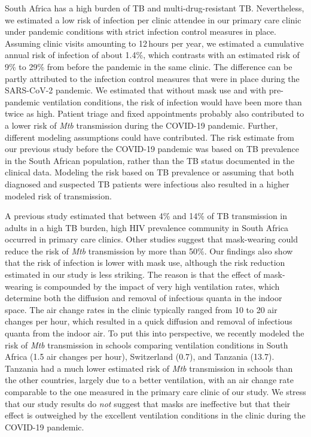 \documentclass[fleqn,11pt]{wlscirep}
\begin{document}
South Africa has a high burden of TB and multi-drug-resistant TB\cite{WHO2023TBReport}. Nevertheless, we estimated a low risk of infection per clinic attendee in our primary care clinic under pandemic conditions with strict infection control measures in place. Assuming clinic visits amounting to 12\,hours per year, we estimated a cumulative annual risk of infection of about 1.4\%, which contrasts with an estimated risk of 9\% to 29\% from before the pandemic in the same clinic\cite{Zurcher2022JID}. The difference can be partly attributed to the infection control measures that were in place during the SARS-CoV-2 pandemic. We estimated that without mask use and with pre-pandemic ventilation conditions, the risk of infection would have been more than twice as high. Patient triage and fixed appointments probably also contributed to a lower risk of \emph{Mtb} transmission during the COVID-19 pandemic. Further, different modeling assumptions could have contributed. The risk estimate from our previous study before the COVID-19 pandemic\cite{Zurcher2022JID} was based on TB prevalence in the South African population, rather than the TB status documented in the clinical data. Modeling the risk based on TB prevalence or assuming that both diagnosed and suspected TB patients were infectious also resulted in a higher modeled risk of transmission. 

A previous study estimated that between 4\% and 14\% of TB transmission in adults in a high TB burden, high HIV prevalence community in South Africa occurred in primary care clinics\cite{McCreesh2022BMJGlobalHealth}. Other studies suggest that mask-wearing could reduce the risk of \emph{Mtb} transmission by more than 50\%\cite{Dharmadhikari2012AJRCCM,McCreesh2021BMJGlobalHealth}. Our findings also show that the risk of infection is lower with mask use, although the risk reduction estimated in our study is less striking. The reason is that the effect of mask-wearing is compounded by the impact of very high ventilation rates, which determine both the diffusion and removal of infectious quanta in the indoor space. The air change rates in the clinic typically ranged from 10 to 20 air changes per hour, which resulted in a quick diffusion and removal of infectious quanta from the indoor air. To put this into perspective, we recently modeled the risk of \emph{Mtb} transmission in schools comparing ventilation conditions in South Africa (1.5 air changes per hour), Switzerland (0.7), and Tanzania (13.7)\cite{Banholzer2024PGPH}. Tanzania had a much lower estimated risk of \emph{Mtb} transmission in schools than the other countries, largely due to a better ventilation, with an air change rate comparable to the one measured in the primary care clinic of our study. We stress that our study results do \emph{not} suggest that masks are ineffective but that their effect is outweighed by the excellent ventilation conditions in the clinic during the COVID-19 pandemic.
\end{document}
